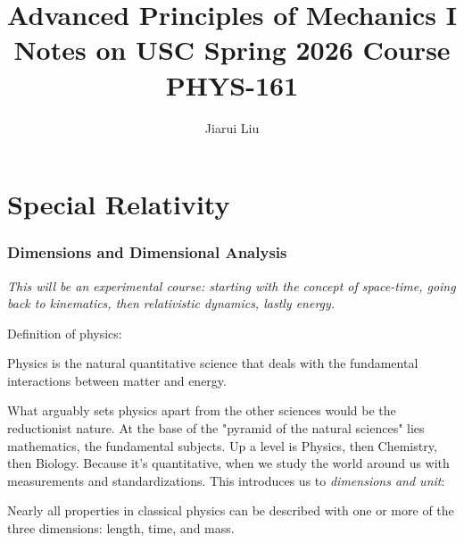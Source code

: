 \documentclass[10pt]{article}
\begin{document}

	\title{{Advanced Principles of Mechanics I}\\{\normalsize{Notes on USC Spring 2026 Course PHYS-161}}}
	\author{Jiarui Liu}
	\maketitle
	\newpage
	\pagestyle{fancynotes}
	\part{Special Relativity}

	\section{Dimensions and Dimensional Analysis}
	\textit{This will be an experimental course: starting with the concept of space-time, going back to kinematics, then relativistic dynamics, lastly energy.}
	
	\vspace{1\baselineskip}
	\noindent Definition of physics:
	\begin{definition}
		Physics is the natural quantitative science that deals with the fundamental interactions between matter and energy.
	\end{definition}

	What arguably sets physics apart from the other sciences would be the reductionist nature. At the base of the "pyramid of the natural sciences" lies mathematics, the fundamental subjects. Up a level is Physics, then Chemistry, then Biology. Because it's quantitative, when we study the world around us with measurements and standardizations. This introduces us to \textit{dimensions and unit}:
	\begin{claim}
		Nearly all properties in classical physics can be described with one or more of the three dimensions: length, time, and mass.
	\end{claim}
\end{document}
